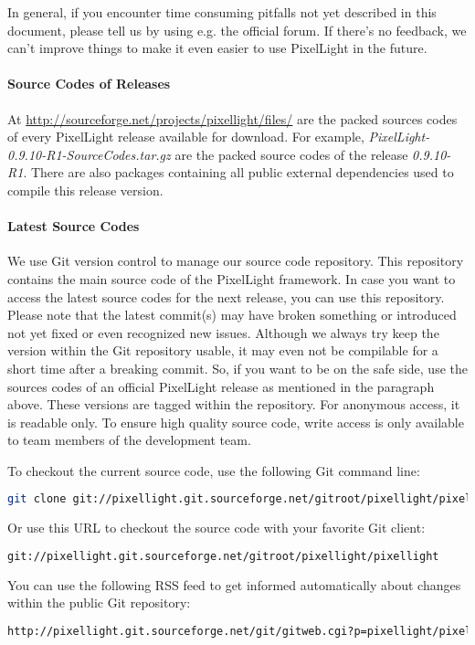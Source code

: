 In general, if you encounter time consuming pitfalls not yet described in this document, please tell us by using e.g. the official forum. If there's no feedback, we can't improve things to make it even easier to use PixelLight in the future.


\paragraph{Source Codes of Releases}
At \url{http://sourceforge.net/projects/pixellight/files/} are the packed sources codes of every PixelLight release available for download. For example, \emph{PixelLight-0.9.10-R1-SourceCodes.tar.gz} are the packed source codes of the release \emph{0.9.10-R1}. There are also packages containing all public external dependencies used to compile this release version.


\paragraph{Latest Source Codes}
We use Git version control to manage our source code repository. This repository contains the main source code of the PixelLight framework. In case you want to access the latest source codes for the next release, you can use this repository. Please note that the latest commit(s) may have broken something or introduced not yet fixed or even recognized new issues. Although we always try keep the version within the Git repository usable, it may even not be compilable for a short time after a breaking commit. So, if you want to be on the safe side, use the sources codes of an official PixelLight release as mentioned in the paragraph above. These versions are tagged within the repository. For anonymous access, it is readable only. To ensure high quality source code, write access is only available to team members of the development team.

To checkout the current source code, use the following Git command line:
\begin{lstlisting}[language=sh]
git clone git://pixellight.git.sourceforge.net/gitroot/pixellight/pixellight
\end{lstlisting}

Or use this \ac{URL} to checkout the source code with your favorite Git client:
\begin{lstlisting}[language=sh]
git://pixellight.git.sourceforge.net/gitroot/pixellight/pixellight
\end{lstlisting}

You can use the following RSS feed to get informed automatically about changes within the public Git repository:
\begin{lstlisting}[language=sh]
http://pixellight.git.sourceforge.net/git/gitweb.cgi?p=pixellight/pixellight;a=rss
\end{lstlisting}
